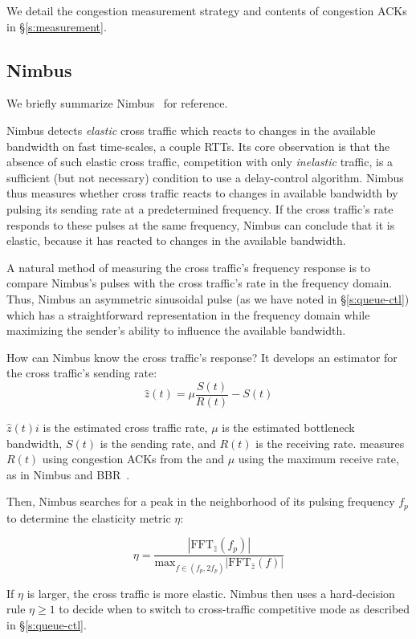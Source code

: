 We detail the congestion measurement strategy and contents of congestion ACKs in \S\ref{s:measurement}.


\begin{Appendix}
\section{Nimbus}\label{s:app:nimbus}

We briefly summarize Nimbus~\cite{nimbus} for reference.

Nimbus detects \emph{elastic} cross traffic which reacts to changes in the available bandwidth on fast time-scales, \ie a couple RTTs. Its core observation is that the absence of such elastic cross traffic, \ie competition with only \emph{inelastic} traffic, is a sufficient (but not necessary) condition to use a delay-control algorithm.
Nimbus thus measures whether cross traffic reacts to changes in available bandwidth by pulsing its sending rate at a predetermined frequency.
If the cross traffic's rate responds to these pulses at the same frequency, Nimbus can conclude that it is elastic, because it has reacted to changes in the available bandwidth.

A natural method of measuring the cross traffic's frequency response is to compare Nimbus's pulses with the cross traffic's rate in the frequency domain.
Thus, Nimbus an asymmetric sinusoidal pulse (as we have noted in \S\ref{s:queue-ctl}) which has a straightforward representation in the frequency domain while maximizing the sender's ability to influence the available bandwidth.

How can Nimbus know the cross traffic's response? It develops an estimator for the cross traffic's sending rate:
\begin{equation}
    \hat{z}(t) = \mu\frac{S(t)}{R(t)} - S(t)
\end{equation}

$\hat{z}(t)i$ is the estimated cross traffic rate, $\mu$ is the estimated bottleneck bandwidth, $S(t)$ is the sending rate, and $R(t)$ is the receiving rate. 
\name measures $R(t)$ using congestion ACKs from the \outbox and $\mu$ using the maximum receive rate, as in Nimbus and BBR~\cite{bbr}.

Then, Nimbus searches for a peak in the neighborhood of its pulsing frequency $f_p$ to determine the elasticity metric $\eta$:

\begin{equation}
    \eta = \frac{|\text{FFT}_{\hat{z}}(f_p)|}{\text{max}_{f \in (f_p, 2f_p)} |\text{FFT}_{\hat{z}}(f)|}
\end{equation}

If $\eta$ is larger, the cross traffic is more elastic.
Nimbus then uses a hard-decision rule $\eta \ge 1$ to decide when to switch to cross-traffic competitive mode as described in \S\ref{s:queue-ctl}.

\end{Appendix}
